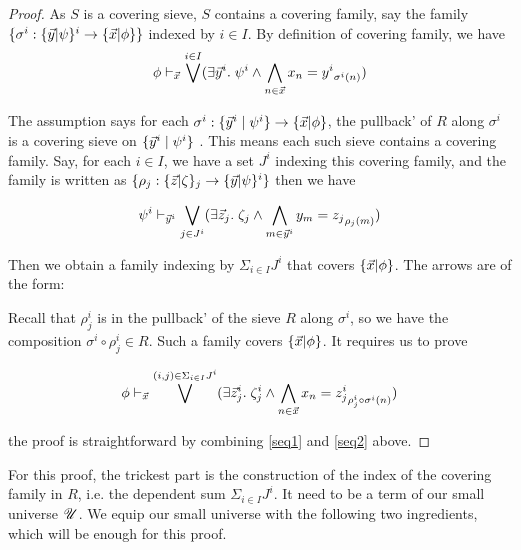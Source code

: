\begin{proof}
  As $S$ is a covering sieve, $S$ contains a covering family, say the family $\{\sigma^i: \{ \vec{y} | \psi \}^i\to \{ \vec{x} | \phi \}\}$ indexed by $i\in I$.
  By definition of covering family, we have
  \begin{equation}\label{seq1}
    \phi \vdash_{\vec{x}} \bigvee^{i\in I} (\exists \vec{y}^i. \;\psi^i \wedge \bigwedge_{n \in \vec{x}} x_n = {y^i}_{\sigma^i(n)})
  \end{equation}

  The assumption says for each $\sigma^i: \{\vec{y}^i\mid \psi^i\} \to \{ \vec{x} | \phi \}$, the pullback' of $R$ along $\sigma^i$ is a covering sieve
  on  $\{\vec{y}^i\mid \psi^i\}$ .
  This means each such sieve contains a covering family. Say, for each $i\in I$, we have a set $J^i$ indexing this covering family, and
  the family is written as $\{\rho_j: \{ \vec{z} | \zeta \}_j\to \{ \vec{y} | \psi \}^i\}$ then we have

  \begin{equation}\label{seq2}
    \psi^i \vdash_{\vec{y}^i} \bigvee_{j\in J^i}
     (\exists \vec{z}_j.\; \zeta_j \wedge \bigwedge_{m \in \vec{y}^i} y_m = {z_j}_{\rho_j(m)})
  \end{equation}

  Then we obtain a family indexing by $\Sigma_{i\in I}J^i$ that covers $\{ \vec{x} | \phi \}$. The arrows are of the form:
  \begin{center}
  \end{center}
  Recall that $\rho^i_j$ is in the pullback' of the sieve $R$ along $\sigma^i$, so we have the composition $\sigma^i\circ \rho^i_j\in R$.
  Such a family covers $\{ \vec{x} | \phi \}$. It requires us to prove

  \begin{equation*}
    \phi \vdash_{\vec{x}} \bigvee^{(i,j)\in \Sigma_{i\in I}J^i}
    (\exists \vec{z}^i_j.\; \zeta^i_j \wedge \bigwedge_{n\in \vec{x}} x_n = {z^i_j}_{\rho^i_j\circ \sigma^i(n)})
  \end{equation*}

  the proof is straightforward by combining \ref{seq1} and \ref{seq2} above.



\end{proof}

For this proof, the trickest part is the construction of the index of the covering family in $R$, i.e. the dependent sum $\Sigma_{i\in I}J^i$.
It need to be a term of our small universe $\mathscr{U}$. We equip our small universe with the following two ingredients, which will be enough for this proof.

